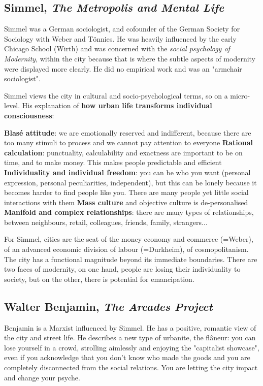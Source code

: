 \documentclass{article}
\begin{document}
\subsection{Simmel, \textit{The Metropolis and Mental Life}}

Simmel was a German sociologist, and cofounder of the German Society for Sociology with Weber and Tönnies. He was heavily influenced by the early Chicago School (Wirth) and was concerned with the \textit{social psychology of Modernity}, within the city because that is where the subtle aspects of modernity were displayed more clearly. He did no empirical work and was an "armchair sociologist". 

Simmel views the city in cultural and socio-psychological terms, so on a micro-level. His explanation of \textbf{how urban life transforms individual consciousness}:


\begin{outline}
	\1 \textbf{Blasé attitude}: we are emotionally reserved and indifferent, because there are too many stimuli to process and we cannot pay attention to everyone
	\1 \textbf{Rational calculation}: punctuality, calculability and exactness are important to be on time, and to make money. This makes people predictable and efficient
	\1 \textbf{Individuality and individual freedom}: you can be who you want (personal expression, personal peculiarities, independent), but this can be lonely because it becomes harder to find people like you. There are many people yet little social interactions with them
	\1 \textbf{Mass culture} and objective culture is de-personalised
	\1 \textbf{Manifold and complex relationships}: there are many types of relationships, between neighbours, retail, colleagues, friends, family, strangers...
\end{outline}

For Simmel, cities are the seat of the money economy and commerce (=Weber), of an advanced economic division of labour (=Durkheim), of cosmopolitanism. 
The city has a functional magnitude beyond its immediate boundaries. 
There are two faces of modernity, on one hand, people are losing their individuality to society, but on the other, there is potential for emancipation.


\subsection{Walter Benjamin, \textit{The Arcades Project}}

Benjamin is a Marxist influenced by Simmel. He has a positive, romantic view of the city and street life. He describes a new type of urbanite, the flâneur: you can lose yourself in a crowd, strolling aimlessly and enjoying the "capitalist showcase", even if you acknowledge that you don't know who made the goods and you are completely disconnected from the social relations. You are letting the city impact and change your psyche.
\end{document}
